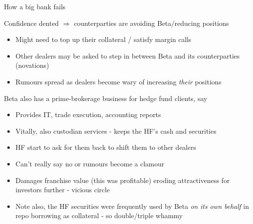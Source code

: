 

\begin{frame}{How a big bank fails}

Confidence dented $\Rightarrow$ counterparties are avoiding Beta/reducing positions
	\begin{itemize}
	\item	Might need to top up their collateral / satisfy margin calls
	\item	Other dealers may be asked to step in between Beta and its counterparties (novations)
	\item	Rumours spread as dealers become wary of increasing \emph{their} positions
	\end{itemize}
\vspace{0.5mm}
Beta also has a prime-brokerage business for hedge fund clients, say
	\begin{itemize}
	\item	Provides IT, trade execution, accounting reports
	\item	Vitally, also custodian services - keeps the HF's cash and securities
	\item	HF start to ask for them back to shift them to other dealers
	\item	Can't really say no or rumours become a clamour
	\item	Damages franchise value (this was profitable) eroding attractiveness for investors further - vicious circle
	\item	Note also, the HF securities were frequently used by Beta \emph{on its own behalf} in repo borrowing as collateral - so double/triple whammy
	\end{itemize}

\end{frame}



